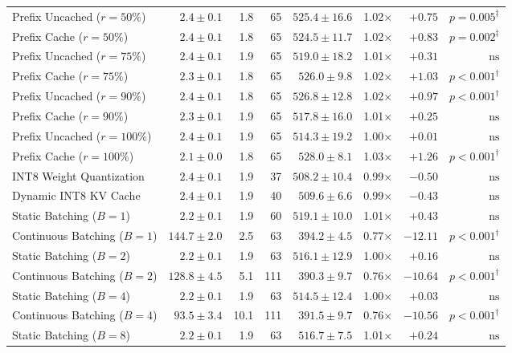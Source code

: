 \begin{table}[t]
{\begin{tabular}{lrrrrrrr}
  Prefix Uncached ($r=50\%$) & $2.4 \pm 0.1$ & 1.8 & 65 & $525.4 \pm 16.6$ & 1.02$\times$ & $+0.75$ & $p = 0.005^\ddagger$ \\
  Prefix Cache ($r=50\%$) & $2.4 \pm 0.1$ & 1.8 & 65 & $524.5 \pm 11.7$ & 1.02$\times$ & $+0.83$ & $p = 0.002^\ddagger$ \\
  Prefix Uncached ($r=75\%$) & $2.4 \pm 0.1$ & 1.9 & 65 & $519.0 \pm 18.2$ & 1.01$\times$ & $+0.31$ & $\text{ns}$ \\
  Prefix Cache ($r=75\%$) & $2.3 \pm 0.1$ & 1.8 & 65 & $526.0 \pm 9.8$ & 1.02$\times$ & $+1.03$ & $p < 0.001^\dagger$ \\
  Prefix Uncached ($r=90\%$) & $2.4 \pm 0.1$ & 1.8 & 65 & $526.8 \pm 12.8$ & 1.02$\times$ & $+0.97$ & $p < 0.001^\dagger$ \\
  Prefix Cache ($r=90\%$) & $2.3 \pm 0.1$ & 1.9 & 65 & $517.8 \pm 16.0$ & 1.01$\times$ & $+0.25$ & $\text{ns}$ \\
  Prefix Uncached ($r=100\%$) & $2.4 \pm 0.1$ & 1.9 & 65 & $514.3 \pm 19.2$ & 1.00$\times$ & $+0.01$ & $\text{ns}$ \\
  Prefix Cache ($r=100\%$) & $2.1 \pm 0.0$ & 1.8 & 65 & $528.0 \pm 8.1$ & 1.03$\times$ & $+1.26$ & $p < 0.001^\dagger$ \\
  INT8 Weight Quantization & $2.4 \pm 0.1$ & 1.9 & 37 & $508.2 \pm 10.4$ & 0.99$\times$ & $-0.50$ & $\text{ns}$ \\
  Dynamic INT8 KV Cache & $2.4 \pm 0.1$ & 1.9 & 40 & $509.6 \pm 6.6$ & 0.99$\times$ & $-0.43$ & $\text{ns}$ \\
  Static Batching ($B=1$) & $2.2 \pm 0.1$ & 1.9 & 60 & $519.1 \pm 10.0$ & 1.01$\times$ & $+0.43$ & $\text{ns}$ \\
  Continuous Batching ($B=1$) & $144.7 \pm 2.0$ & 2.5 & 63 & $394.2 \pm 4.5$ & 0.77$\times$ & $-12.11$ & $p < 0.001^\dagger$ \\
  Static Batching ($B=2$) & $2.2 \pm 0.1$ & 1.9 & 63 & $516.1 \pm 12.9$ & 1.00$\times$ & $+0.16$ & $\text{ns}$ \\
  Continuous Batching ($B=2$) & $128.8 \pm 4.5$ & 5.1 & 111 & $390.3 \pm 9.7$ & 0.76$\times$ & $-10.64$ & $p < 0.001^\dagger$ \\
  Static Batching ($B=4$) & $2.2 \pm 0.1$ & 1.9 & 63 & $514.5 \pm 12.4$ & 1.00$\times$ & $+0.03$ & $\text{ns}$ \\
  Continuous Batching ($B=4$) & $93.5 \pm 3.4$ & 10.1 & 111 & $391.5 \pm 9.7$ & 0.76$\times$ & $-10.56$ & $p < 0.001^\dagger$ \\
  Static Batching ($B=8$) & $2.2 \pm 0.1$ & 1.9 & 63 & $516.7 \pm 7.5$ & 1.01$\times$ & $+0.24$ & $\text{ns}$ \\

\end{tabular}}
\end{table}
